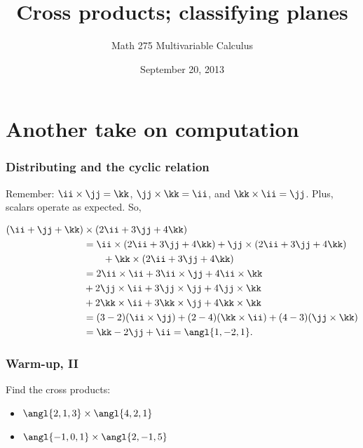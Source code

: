 \documentclass[11pt,ignorenonframetext,xcolor={svgnames},aspectratio=169]{beamer}
\title{Cross products; classifying planes}
\author{Math 275 Multivariable Calculus}
\date{September 20, 2013 }
\begin{document}
\frame{\titlepage}

\section{Another take on computation}

\begin{frame}\frametitle{Distributing and the cyclic relation}

Remember: $\ii \times \jj = \kk$, $\jj \times \kk = \ii$, and
$\kk \times \ii = \jj$. Plus, scalars operate as expected. So,

\begin{align*}
    (\ii + \jj + \kk) &\times (2 \ii + 3 \jj + 4 \kk) \\
    &= \ii \times (2 \ii + 3 \jj + 4 \kk) + \jj \times (2 \ii + 3 \jj + 4 \kk) \\
    &\qquad + \kk \times (2 \ii + 3 \jj + 4 \kk) \\
    &= 2 \ii \times \ii + 3 \ii \times \jj + 4 \ii \times \kk \\
    &+ 2 \jj \times \ii + 3 \jj \times \jj + 4 \jj \times \kk \\
    &+ 2 \kk \times \ii + 3 \kk \times \jj + 4 \kk \times \kk \\
    &= (3-2)(\ii \times \jj) + (2-4)(\kk \times \ii) + (4-3)(\jj \times \kk) \\
    &= \kk - 2 \jj + \ii = \angl{1, -2, 1}.
\end{align*}

\end{frame}

\begin{frame}\frametitle{Warm-up, II}

Find the cross products:

\begin{itemize}

\item
  $\angl{2, 1, 3} \times \angl{4, 2, 1}$
\item
  $\angl{-1, 0, 1} \times \angl{2, -1, 5}$
\end{itemize}

\end{frame}
\end{document}
